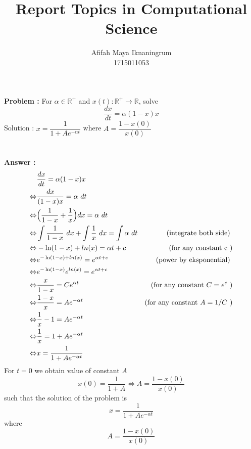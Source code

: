 \documentclass[a4paper,10pt]{article}
\title{Report Topics in Computational Science}
\author{Afifah Maya Iknaningrum \\ 1715011053}
\begin{document}
	\maketitle
	
	\textbf{Problem : } For $ \alpha \in \mathbb{R}^+ $ and $ x(t) : \mathbb{R}^+ \rightarrow \mathbb{R} $, solve
	\[ \dfrac{dx}{dt} = \alpha(1-x)x \]
	Solution : $ x = \dfrac{1}{1+Ae^{-\alpha t}} $ where $ A = \dfrac{1-x(0)}{x(0)} $ \\ \\ \\
	
	\textbf{Answer : }
	\begin{eqnarray} \nonumber
	& \dfrac{dx}{dt} = \alpha (1-x) x \\ \nonumber
	\Leftrightarrow & \dfrac{dx}{(1-x)x} = \alpha \ dt \\ \nonumber
	\Leftrightarrow & \Big( \dfrac{1}{1-x} + \dfrac{1}{x} \Big) dx = \alpha \ dt \\ \nonumber
	\Leftrightarrow & \int \dfrac{1}{1-x} \ dx + \int \dfrac{1}{x} \ dx = \int  \alpha \ dt & \text{(integrate both side) } \\ \nonumber
	\Leftrightarrow & -\ln(1-x) + ln(x) = \alpha t + c & \text{(for any constant c )}\\ \nonumber
	\Leftrightarrow & e^{-\ln(1-x) + ln(x)} = e^{\alpha t + c} & \text{(power by eksponential) } \\ \nonumber
	\Leftrightarrow & e^{-\ln(1-x)} e^{ln(x)} = e^{\alpha t + c} \\ \nonumber
	\Leftrightarrow & \dfrac{x}{1-x} = C e^{\alpha t} & \text{(for any constant $ C = e^{c} $ )}\\ \nonumber
	\Leftrightarrow & \dfrac{1-x}{x} = A e^{-\alpha t} & \text{(for any constant $ A = 1/C $ )}\\ \nonumber
	\Leftrightarrow & \dfrac{1}{x} - 1 = A e^{-\alpha t} \\ \nonumber
	\Leftrightarrow & \dfrac{1}{x} = 1+A e^{-\alpha t}\\ \nonumber
	\Leftrightarrow & x = \dfrac{1}{1+A e^{-\alpha t}}
	\end{eqnarray}
	For $ t=0 $ we obtain value of constant $ A $
	\[ x(0) = \dfrac{1}{1+A} \Leftrightarrow A = \dfrac{1-x(0)}{x(0)} \]
	such that the solution of the problem is
	\[ x = \dfrac{1}{1+A e^{-\alpha t}} \]
	where
	\[ A = \dfrac{1-x(0)}{x(0) }\]	
\end{document}
